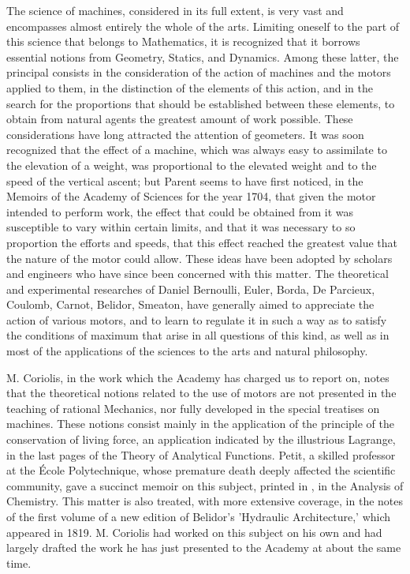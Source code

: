 \documentclass{book}
\begin{document}
The science of machines, considered in its full extent, is very vast and encompasses almost entirely the whole of the arts. Limiting oneself to the part of this science that belongs to Mathematics, it is recognized that it borrows essential notions from Geometry, Statics, and Dynamics. Among these latter, the principal consists in the consideration of the action of machines and the motors applied to them, in the distinction of the elements of this action, and in the search for the proportions that should be established between these elements, to obtain from natural agents the greatest amount of work possible. These considerations have long attracted the attention of geometers. It was soon recognized that the effect of a machine, which was always easy to assimilate to the elevation of a weight, was proportional to the elevated weight and to the speed of the vertical ascent; but Parent seems to have first noticed, in the Memoirs of the Academy of Sciences for the year 1704, that given the motor intended to perform work, the effect that could be obtained from it was susceptible to vary within certain limits, and that it was necessary to so proportion the efforts and speeds, that this effect reached the greatest value that the nature of the motor could allow. These ideas have been adopted by scholars and engineers who have since been concerned with this matter. The theoretical and experimental researches of Daniel Bernoulli, Euler, Borda, De Parcieux, Coulomb, Carnot, Belidor, Smeaton, have generally aimed to appreciate the action of various motors, and to learn to regulate it in such a way as to satisfy the conditions of maximum that arise in all questions of this kind, as well as in most of the applications of the sciences to the arts and natural philosophy.

M. Coriolis, in the work which the Academy has charged us to report on, notes that the theoretical notions related to the use of motors are not presented in the teaching of rational Mechanics, nor fully developed in the special treatises on machines. These notions consist mainly in the application of the principle of the conservation of living force, an application indicated by the illustrious Lagrange, in the last pages of the Theory of Analytical Functions. Petit, a skilled professor at the École Polytechnique, whose premature 
 death deeply affected the scientific community, gave a succinct memoir on this subject, printed in 
, in the Analysis of Chemistry.
This matter is also treated, with more extensive coverage, in the notes of the first volume of a new edition of Belidor's 'Hydraulic Architecture,' which appeared in 1819. M. Coriolis had worked on this subject on his own and had largely drafted the work he has just presented to the Academy at about the same time.
\end{document}
